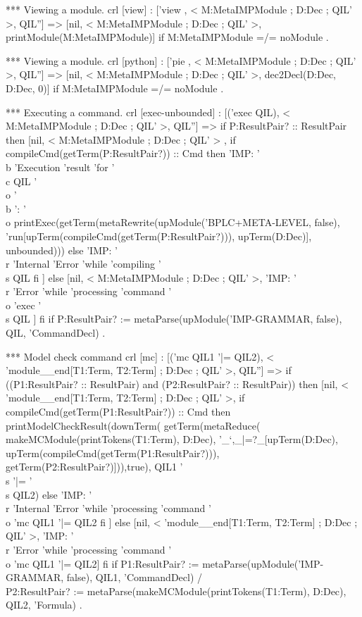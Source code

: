 \documentclass{llncs}%
\begin{document}
 *** Viewing a module.
 crl [view] : ['view , < M:MetaIMPModule ; D:Dec ; QIL' >, QIL''] =>
              [nil, < M:MetaIMPModule ; D:Dec ; QIL' >,
                           printModule(M:MetaIMPModule)]
  if M:MetaIMPModule =/= noModule .

 *** Viewing a module.
 crl [python] : ['pie , < M:MetaIMPModule ; D:Dec ; QIL' >, QIL''] =>
                [nil, < M:MetaIMPModule ; D:Dec ; QIL' >,
                      dec2Decl(D:Dec, D:Dec, 0)]
  if M:MetaIMPModule =/= noModule .

 *** Executing a command.
 crl [exec-unbounded] : [('exec QIL), 
                         < M:MetaIMPModule ; D:Dec ; QIL' >, QIL''] =>
  if P:ResultPair? :: ResultPair
  then [nil, < M:MetaIMPModule ; D:Dec ; QIL' > ,
        if compileCmd(getTerm(P:ResultPair?)) :: Cmd
        then
          'IMP: '\\b 'Execution 'result 'for '\\c QIL '\\o '\\b ': '\\o
          printExec(getTerm(metaRewrite(upModule('BPLC+META-LEVEL, false),
           'run[upTerm(compileCmd(getTerm(P:ResultPair?))), 
                upTerm(D:Dec)], unbounded)))
        else 'IMP: '\\r 'Internal 'Error 'while 'compiling '\\s QIL
        fi ]
  else [nil, < M:MetaIMPModule ; D:Dec ; QIL' >,
        'IMP: '\\r 'Error 'while 'processing 'command '\\o 'exec '\\s QIL ]
  fi
  if P:ResultPair? :=
     metaParse(upModule('IMP-GRAMMAR, false), QIL, 'CommandDecl) .

 *** Model check command
 crl [mc] : [('mc QIL1 '|= QIL2), 
             < 'module__end[T1:Term, T2:Term] ; D:Dec ; QIL' >, QIL''] =>
  if ((P1:ResultPair? :: ResultPair) and (P2:ResultPair? :: ResultPair))
  then [nil, < 'module__end[T1:Term, T2:Term] ; D:Dec ; QIL' >,
        if compileCmd(getTerm(P1:ResultPair?)) :: Cmd
        then
         printModelCheckResult(downTerm(
          getTerm(metaReduce(
           makeMCModule(printTokens(T1:Term), D:Dec),
            '_`,_|=?_[upTerm(D:Dec),
           upTerm(compileCmd(getTerm(P1:ResultPair?))),
            getTerm(P2:ResultPair?)])),true), QIL1 '\\s '|= '\\s QIL2)
        else 'IMP: '\\r 'Internal 'Error 'while 
             'processing 'command '\\o 'mc QIL1 '|= QIL2
        fi ]
  else [nil, < 'module__end[T1:Term, T2:Term] ; D:Dec ; QIL' >,
               'IMP: '\\r 'Error 'while 'processing 'command '\\o 
               'mc QIL1 '|= QIL2]
  fi
 if P1:ResultPair? := 
       metaParse(upModule('IMP-GRAMMAR, false), QIL1, 'CommandDecl) /\\
    P2:ResultPair? := 
       metaParse(makeMCModule(printTokens(T1:Term), D:Dec), QIL2, 'Formula) .
\end{document}
